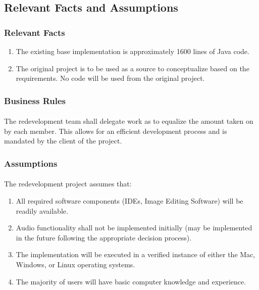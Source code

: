 \documentclass[12pt, titlepage]{article}
\begin{document}
\subsection{Relevant Facts and Assumptions}

\subsubsection{Relevant Facts}
\begin{enumerate}[i]
\item The existing base implementation is approximately 1600 lines of Java code.
\item The original project is to be used as a source to conceptualize based on the requirements. No code will be used from the original project.
\end{enumerate}

\subsubsection{Business Rules}
\paragraph{}
The redevelopment team shall delegate work as to equalize the amount taken on by each member. This allows for an efficient development process and is mandated by the client of the project.

\subsubsection{Assumptions}
\paragraph{}
The redevelopment project assumes that:
\begin{enumerate}[i]
\item All required software components (IDEs, Image Editing Software) will be readily available.
\item Audio functionality shall not be implemented initially (may be implemented in the future following the appropriate decision process).
\item The implementation will be executed in a verified instance of either the Mac, Windows, or Linux operating systems.
\item The majority of users will have basic computer knowledge and experience.
\end{enumerate}
\end{document}
